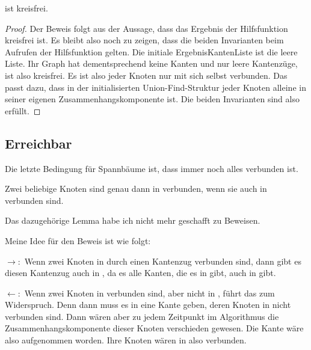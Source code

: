 \begin{lemma}[\KruskalSimpleGraphofkruskalIsAcyclic]\label{KruskalSimpleGraphofkruskalIsAcyclic}
  \KruskalSimpleGraphofkruskal ist kreisfrei.
\end{lemma}
\begin{proof}
  Der Beweis folgt aus der Aussage, dass das Ergebnis der Hilfsfunktion kreisfrei ist.
  Es bleibt also noch zu zeigen, dass die beiden Invarianten beim Aufrufen der Hilfsfunktion gelten.
  Die initiale ErgebnisKantenListe ist die leere Liste.
  Ihr Graph hat dementsprechend keine Kanten und nur leere Kantenzüge, ist also kreisfrei.
  Es ist also jeder Knoten nur mit sich selbst verbunden.
  Das passt dazu, dass in der initialisierten Union-Find-Struktur jeder Knoten alleine in seiner eigenen Zusammenhangskomponente ist.
  Die beiden Invarianten sind also erfüllt.
\end{proof}

\subsection{Erreichbar}

Die letzte Bedingung für Spannbäume ist, dass immer noch alles verbunden ist.

\begin{theorem}
  Zwei beliebige Knoten sind genau dann in \KruskalSimpleGraphofkruskal verbunden, wenn sie auch in \KruskalSimpleGraphofnofedgeList verbunden sind.
\end{theorem}

Das dazugehörige Lemma habe ich nicht mehr geschafft zu Beweisen.

\begin{lemma}[\KruskalSimpleGraphofkruskalIsEqReachable]\label{KruskalSimpleGraphofkruskalIsEqReachable}
\end{lemma}
Meine Idee für den Beweis ist wie folgt:

$\rightarrow:$
Wenn zwei Knoten in \KruskalSimpleGraphofkruskal durch einen Kantenzug verbunden sind, dann gibt es diesen Kantenzug auch in \KruskalSimpleGraphofnofedgeList,
da es alle Kanten, die es in \KruskalSimpleGraphofkruskal gibt, auch in \KruskalSimpleGraphofnofedgeList gibt.

$\leftarrow:$
Wenn zwei Knoten in \KruskalSimpleGraphofnofedgeList verbunden sind, aber nicht in \KruskalSimpleGraphofkruskal, führt das zum Widerspruch.
Denn dann muss es in \KruskalSimpleGraphofnofedgeList eine Kante geben, deren Knoten in \KruskalSimpleGraphofkruskal nicht verbunden sind.
Dann wären aber zu jedem Zeitpunkt im Algorithmus die Zusammenhangskomponente dieser Knoten verschieden gewesen.
Die Kante wäre also aufgenommen worden.
Ihre Knoten wären in \KruskalSimpleGraphofkruskal also verbunden.

